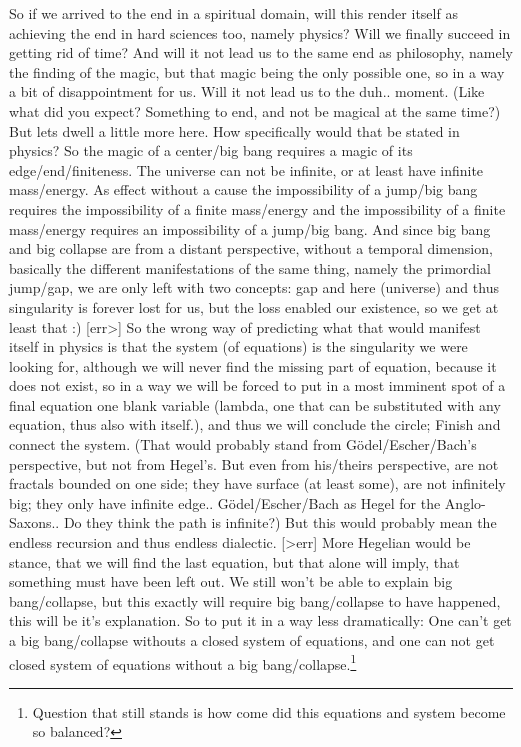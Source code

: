 \documentclass[10pt]{book}
\begin{document}
So if we arrived to the end in a spiritual domain, will this render itself as achieving the end in hard sciences too, namely physics? Will we finally succeed in getting rid of time? And will it not lead us to the same end as philosophy, namely the finding of the magic, but that magic being the only possible one, so in a way a bit of disappointment for us. Will it not lead us to the duh.. moment. (Like what did you expect? Something to end, and not be magical at the same time?) But lets dwell a little more here. How specifically would that be stated in physics?
So the magic of a center/big bang requires a magic of its edge/end/finiteness. The universe can not be infinite, or at least have infinite mass/energy. As effect without a cause the impossibility of a jump/big bang requires the impossibility of a finite mass/energy and the impossibility of a finite mass/energy requires an impossibility of a jump/big bang. 
And since big bang and big collapse are from a distant perspective, without a temporal dimension, basically the different manifestations of the same thing, namely the primordial jump/gap, we are only left with two concepts: gap and here (universe) and thus singularity is forever lost for us, but the loss enabled our existence, so we get at least that :)
[err>] So the wrong way of predicting what that would manifest itself in physics is that the system (of equations) is the singularity we were looking for, although we will never find the missing part of equation, because it does not exist, so in a way we will be forced to put in a most imminent spot of a final equation one blank variable (lambda, one that can be substituted with any equation, thus also with itself.), and thus we will conclude the circle; Finish and connect the system.
(That would probably stand from Gödel/Escher/Bach's perspective, but not from Hegel's. But even from his/theirs perspective, are not fractals bounded on one side; they have surface (at least some), are not infinitely big; they only have infinite edge.. Gödel/Escher/Bach as Hegel for the Anglo-Saxons.. Do they think the path is infinite?) But this would probably mean the endless recursion and thus endless dialectic. [>err] More Hegelian would be stance, that we will find the last equation, but that alone will imply, that something must have been left out. We still won't be able to explain big bang/collapse, but this exactly will require big bang/collapse to have happened, this will be it's explanation.
So to put it in a way less dramatically: One can't get a big bang/collapse withouts a closed system of equations, and one can not get closed system of equations without a big bang/collapse.\footnote{Question that still stands is how come did this equations and system become so balanced?}
\end{document}
